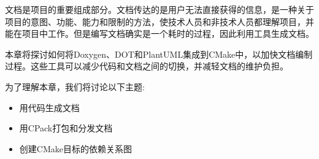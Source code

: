 文档是项目的重要组成部分。文档传达的是用户无法直接获得的信息，是一种关于项目的意图、功能、能力和限制的方法，使技术人员和非技术人员都理解项目，并能在项目中工作。但是编写文档确实是一个耗时的过程，因此利用工具生成文档。

本章将探讨如何将Doxygen、DOT和PlantUML集成到CMake中，以加快文档编制过程。这些工具可以减少代码和文档之间的切换，并减轻文档的维护负担。

为了理解本章，我们将讨论以下主题:

\begin{itemize}
\item 
用代码生成文档

\item 
用CPack打包和分发文档

\item 
创建CMake目标的依赖关系图
\end{itemize}







